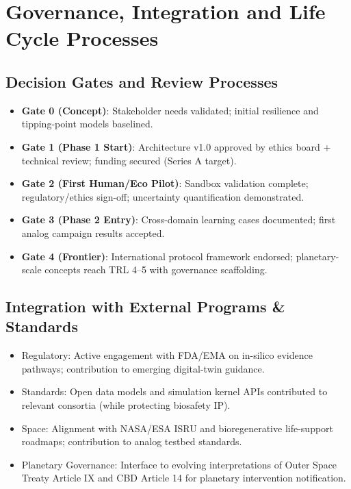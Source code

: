 \documentclass[11pt,a4paper]{report}
\begin{document}
\chapter{Governance, Integration and Life Cycle Processes}

\section{Decision Gates and Review Processes}

\begin{itemize}
    \item \textbf{Gate 0 (Concept)}: Stakeholder needs validated; initial resilience and tipping-point models baselined.
    \item \textbf{Gate 1 (Phase 1 Start)}: Architecture v1.0 approved by ethics board + technical review; funding secured (Series A target).
    \item \textbf{Gate 2 (First Human/Eco Pilot)}: Sandbox validation complete; regulatory/ethics sign-off; uncertainty quantification demonstrated.
    \item \textbf{Gate 3 (Phase 2 Entry)}: Cross-domain learning cases documented; first analog campaign results accepted.
    \item \textbf{Gate 4 (Frontier)}: International protocol framework endorsed; planetary-scale concepts reach TRL 4--5 with governance scaffolding.
\end{itemize}

\section{Integration with External Programs \& Standards}

\begin{itemize}
    \item Regulatory: Active engagement with FDA/EMA on in-silico evidence pathways; contribution to emerging digital-twin guidance.
    \item Standards: Open data models and simulation kernel APIs contributed to relevant consortia (while protecting biosafety IP).
    \item Space: Alignment with NASA/ESA ISRU and bioregenerative life-support roadmaps; contribution to analog testbed standards.
    \item Planetary Governance: Interface to evolving interpretations of Outer Space Treaty Article IX and CBD Article 14 for planetary intervention notification.
\end{itemize}
\end{document}
